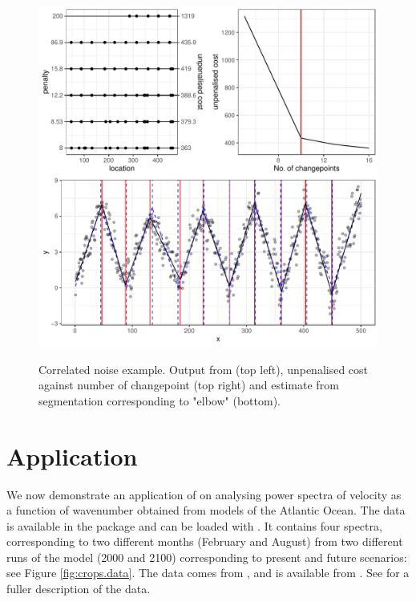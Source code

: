 \documentclass[article]{jss}
\begin{document}
\begin{figure}
\centering
{\includegraphics{figures/cpop_crops_ggplot.pdf}}
\caption{Correlated noise example. Output from  (top left), unpenalised cost against number of changepoint (top right) and estimate from segmentation corresponding to "elbow" (bottom).}
\label{fig:crops.cpopB}
\end{figure}


\section{Application} \label{sec:app}

We now demonstrate an application of  on analysing power spectra of velocity as a function of wavenumber obtained from models of the Atlantic Ocean. The data is available in the  package and can be loaded with . It contains four spectra, corresponding to two different months (February and August) from two different runs of the model (2000 and 2100) corresponding to present and future scenarios: see Figure \ref{fig:crops.data}. The data comes from \cite{richards2021impact}, and is available from \cite{richards2020data}. See \cite{richards2021impact} for a fuller description of the data.
\end{document}
